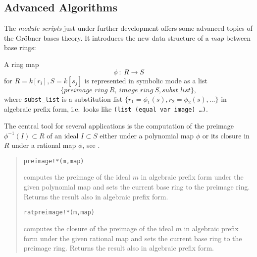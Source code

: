 \documentclass[a4paper,11pt]{article}
\newcommand{\gr}{Gr\"obner}
\newcommand{\ind}[1]{{\em #1}\index{#1}}
\newcommand{\pbx}[1]{\mbox{}\hfill \parbox[t]{12cm}{#1} \pagebreak[3]}
\begin{document}
\subsection{Advanced Algorithms}

The \ind{module scripts} just under further development offers some
advanced topics of the {\gr} bases theory. It introduces the new data
structure of a \ind{map} between base rings:
\medskip

A ring map 
\[ \phi\ :\ R\longrightarrow S\]
for $R=k[r_i], S=k[s_j]$ is represented in symbolic mode as a list
\[   \{preimage\_ring\ R,\ image\_ring\ S, subst\_list\},\]
where {\tt subst\_list} is a substitution list $\{r_1=\phi_1(s),
r_2=\phi_2(s),\ldots \}$ in algebraic prefix form, i.e.\ looks like
{\tt (list (equal var image) \ldots )}. 

The central tool for several applications is the computation of the
preimage $\phi^{-1}(I)\subset R$ of an ideal $I\subset S$ either
under a polynomial map $\phi$ or its closure in $R$ under a rational
map $\phi$, see \cite[7.69 and 7.71]{BKW}.
\begin{quote}
\verb|preimage!*(m,map)| 

\pbx{computes the preimage of the ideal $m$ in algebraic prefix form
under the given polynomial map and sets the current base ring to the
preimage ring. Returns the result also in algebraic prefix form.}

\verb|ratpreimage!*(m,map)| 

\pbx{computes the closure of the preimage of the ideal $m$ in
algebraic prefix form under the given rational map and sets the
current base ring to the preimage ring. Returns the result also in
algebraic prefix form.}

\end{quote}
\end{document}
